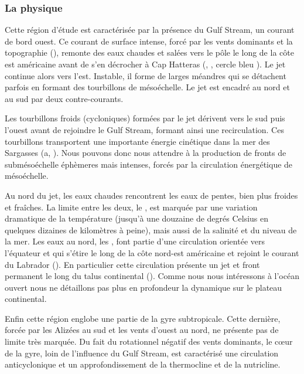 \subsubsection{La physique}
\label{sec:gs-physique}

Cette région d'étude est caractérisée par la présence du Gulf Stream, un courant de bord ouest.
Ce courant de surface intense, forcé par les vents dominants et la topographie (\cite{fieux_2010}), remonte des eaux chaudes et salées vers le pôle le long de la côte est américaine avant de s'en décrocher à Cap Hatteras (, , cercle bleu ).
Le jet continue alors vers l'est. Instable, il forme de larges méandres qui se détachent parfois en formant des tourbillons de mésoéchelle.
Le jet est encadré au nord et au sud par deux contre-courants.

Les tourbillons froids (cycloniques) formées par le jet dérivent vers le sud puis l'ouest avant de rejoindre le Gulf Stream, formant ainsi une recirculation.
Ces tourbillons transportent une importante énergie cinétique dans la mer des Sargasses (a, \cite{wunsch_1998,zhai_2008}).
Nous pouvons donc nous attendre à la production de fronts de submésoéchelle éphèmeres mais intenses, forcés par la circulation énergétique de mésoéchelle.

Au nord du jet, les eaux chaudes rencontrent les eaux de pentes, bien plus froides et fraîches.
La limite entre les deux, le , est marquée par une variation dramatique de la température (jusqu'à une douzaine de degrés Celsius en quelques dizaines de kilomètres à peine), mais aussi de la salinité et du niveau de la mer.
Les eaux au nord, les , font partie d'une circulation orientée vers l'équateur et qui s'étire le long de la côte nord-est américaine et rejoint le courant du Labrador (\cite{fieux_2010,townsend_2004}).
En particulier cette circulation présente un jet et front permanent le long du talus continental (\cite{linder_1998,flagg_2006}).
Comme nous nous intéressons à l'océan ouvert nous ne détaillons pas plus en profondeur la dynamique sur le plateau continental.

Enfin cette région englobe une partie de la gyre subtropicale.
Cette dernière, forcée par les Alizées au sud et les vents d'ouest au nord, ne présente pas de limite très marquée.
Du fait du rotationnel négatif des vents dominants, le cœur de la gyre, loin de l'influence du Gulf Stream, est caractérisé une circulation anticyclonique et un approfondissement de la thermocline et de la nutricline.

